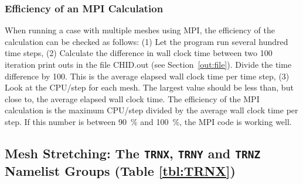 \documentclass[11pt]{book}
\begin{document}
\subsubsection{Efficiency of an MPI Calculation}

When running a case with multiple meshes using MPI, the efficiency of the calculation can be checked as follows: (1) Let the program run several hundred time steps, (2) Calculate the difference in wall clock time between two 100 iteration print outs in the file {\ct CHID.out} (see Section~\ref{out:file}). Divide the time difference by 100. This is the average elapsed wall clock time per time step, (3) Look at the {\ct CPU/step} for each mesh. The largest value should be less than, but close to, the average elapsed wall clock time. The efficiency of the MPI calculation is the maximum {\ct CPU/step} divided by the average wall clock time per step. If this number is between 90~\% and 100~\%, the MPI code is working well.



\subsection{Mesh Stretching: The \texorpdfstring{{\tt TRNX}}{TRNX}, \texorpdfstring{{\tt TRNY}}{TRNY} and \texorpdfstring{{\tt TRNZ}}{TRNZ} Namelist Groups (Table \ref{tbl:TRNX})}
\label{info:TRNX}
\end{document}
